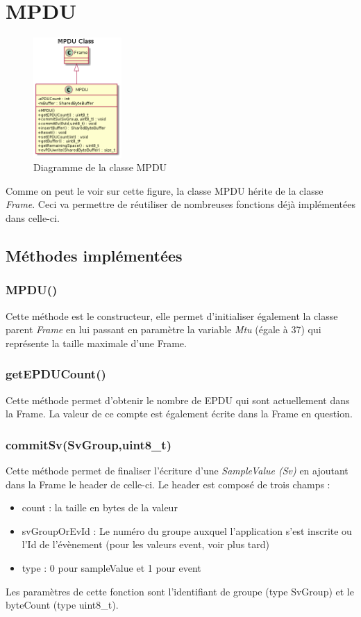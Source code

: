 \documentclass{report}
\begin{document}
\section{MPDU}
\begin{figure}[H]
    \centering
    \includegraphics[width= 0.3\textwidth]{Images/MPDU.png}
    \caption{Diagramme de la classe MPDU}
    \label{fig:MPDUDiagram}
\end{figure}
Comme on peut le voir sur cette figure, la classe MPDU hérite de la classe \textit{Frame}. Ceci va permettre de réutiliser de nombreuses fonctions déjà implémentées dans celle-ci. 
\subsection{Méthodes implémentées}
\subsubsection{MPDU()}
Cette méthode est le constructeur, elle permet d'initialiser également la classe parent \textit{Frame} en lui passant en paramètre la variable \textit{Mtu} (égale à 37) qui représente la taille maximale d'une Frame.
\subsubsection{getEPDUCount()}
Cette méthode permet d'obtenir le nombre de EPDU qui sont actuellement dans la Frame. La valeur de ce compte est également écrite dans la Frame en question.
\subsubsection{commitSv(SvGroup,uint8\_t)}
Cette méthode permet de finaliser l'écriture d'une \textit{SampleValue (Sv)} en ajoutant dans la Frame le header de celle-ci. Le header est composé de trois champs :
\begin{itemize}
\item count : la taille en bytes de la valeur
\item svGroupOrEvId : Le numéro du groupe auxquel l'application s'est inscrite ou l'Id de l'évènement (pour les valeurs event, voir plus tard)
\item type : 0 pour sampleValue et 1 pour event 
\end{itemize}
Les paramètres de cette fonction sont l'identifiant de groupe (type SvGroup) et le byteCount (type uint8\_t).
\end{document}
